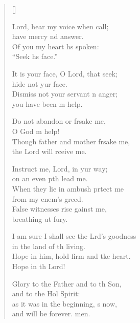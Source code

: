 \settowidth{\versewidth}{I am sure I shall see the Lord’s goodness *}
\begin{verse}[\versewidth]
  \begin{patverse}
 Lord, hear my voice when  call;\Med\\
have mercy nd answer.\\
Of you my heart hs spoken:\Med\\
“Seek h\pointup{\i}s face.”

It is your face, O Lord, that  seek;\Med\\
hide not yur face.\\
Dismiss not your servant \pointup{\i}n anger;\Med\\
you have been m help.

Do not abandon or frsake me,\Med\\
O God m help!\\
Though father and mother frsake me,\Med\\
the Lord will rceive me.

Instruct me, Lord, in yur way;\Med\\
on an even pth lead me.\\
When they lie in ambush prtect me\Med\\
from my enem’s greed.\\
False witnesses rise gainst me,\Med\\
breathing ut fury.

I am sure I shall see the Lrd’s goodness\Med\\
in the land of th living.\\
Hope in him, hold firm and tke heart.\Med\\
Hope in th Lord!

Glory to the Father and to th Son,\Med\\
and to the Hol Spirit:\\
as it was in the beginning, \pointup{\i}s now,\Med\\
and will be forever. men.
  \end{patverse}
\end{verse}
